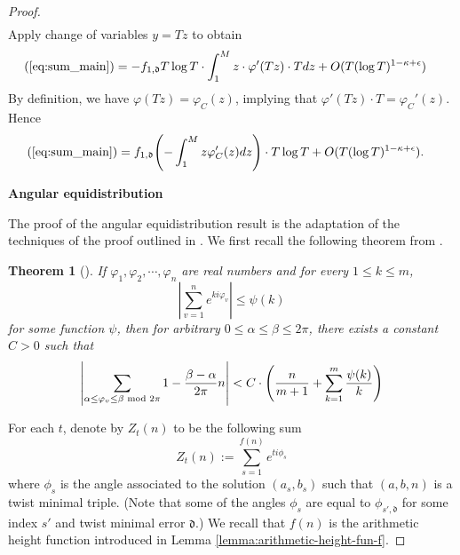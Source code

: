 \documentclass[12pt]{amsart}
\newcounter{counter}[section] %
\numberwithin{equation}{section} %
\newtheorem{theorem}[counter]{Theorem}
\theoremstyle{definition} \newtheorem{definition}[counter]{Definition}
\theoremstyle{remark} \newtheorem{nonexam}[counter]{Non-example}
\let\originalleft\left \let\originalright\right
\renewcommand{\left}{\mathopen{}\mathclose\bgroup\originalleft}
\renewcommand{\right}{\aftergroup\egroup\originalright}
\begin{document}
\begin{proof}
\begin{align}
    \end{align}
    Apply change of variables $y = Tz$ to obtain
    \begin{align}
        \begin{split}
            (\ref{eq:sum_main}) &= - f_{1,\mathfrak{d}} T \log T \cdot \int_{1}^{M} z \cdot \varphi'(Tz) \cdot T dz + O(T (\log T)^{1-\kappa + \epsilon})
        \end{split}
    \end{align}
    By definition, we have $\varphi(Tz) = \varphi_{C}(z)$, implying that $\varphi'(Tz) \cdot T = \varphi_{C}'(z)$. Hence
    \begin{align}
        \begin{split}
            (\ref{eq:sum_main}) &= f_{1,\mathfrak{d}} \left( - \int_{1}^{M} z \varphi'_{C}(z) dz \right) \cdot T \log T + O(T (\log T)^{1-\kappa + \epsilon}).
        \end{split}
    \end{align}

\medskip
\textbf{Angular equidistribution}
\medskip
    
    The proof of the angular equidistribution result is the adaptation of the techniques of the proof outlined in \cite{EH99}. We first recall the following theorem from \cite{ET48}.
    \begin{theorem}[\cite{ET48}] \label{theorem:ET}
        If $\varphi_1, \varphi_2, \cdots, \varphi_n$ are real numbers and for every $1 \leq k \leq m$, 
        \begin{equation}
            |\sum_{v=1}^n e^{k i \varphi_v} | \leq \psi(k)
        \end{equation}
        for some function $\psi$, then for arbitrary $0 \leq \alpha \leq \beta \leq 2 \pi$, there exists a constant $C > 0$ such that
        \begin{equation}
            \left| \sum_{\alpha \leq \varphi_v \leq \beta \text{ mod } 2 \pi} 1 -  \frac{\beta - \alpha}{2 \pi} n \right| < C \cdot \left( \frac{n}{m+1} + \sum_{k=1}^m \frac{\psi(k)}{k} \right)
        \end{equation}
    \end{theorem}
    For each $t$, denote by $Z_t(n)$ to be the following sum
    \begin{equation}
        Z_t(n) := \sum_{s=1}^{f(n)} e^{ti\phi_s}
    \end{equation}
    where $\phi_s$ is the angle associated to the solution $(a_s, b_s)$ such that $(a,b,n)$ is a twist minimal triple. (Note that some of the angles $\phi_{s}$ are equal to $\phi_{s',\mathfrak{d}}$ for some index $s'$ and twist minimal error $\mathfrak{d}$.) We recall that $f(n)$ is the arithmetic height function introduced in Lemma \ref{lemma:arithmetic-height-fun-f}.


\end{proof}
\end{document}
